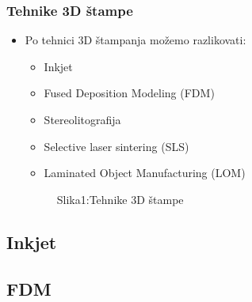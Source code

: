 \documentclass{beamer}
\begin{document}
\begin{frame}[fragile]\frametitle{Tehnike 3D štampe}
	\begin{itemize}
    \item Po tehnici 3D štampanja možemo razlikovati:
    \begin{itemize}
        \item Inkjet
        \item  Fused Deposition Modeling (FDM)
        \item Stereolitografija
        \item Selective laser sintering (SLS)
        \item Laminated Object Manufacturing (LOM)
        
    \end{itemize}
\begin{figure}[!tbp]
  \centering
  \hfill
  \hfill
  \label{Slika 1}
    \caption{\scriptsize{Slika1:Tehnike 3D štampe}}
    \end{figure}
\end{itemize}
\end{frame}
\subsection{Inkjet}


\subsection{FDM}
\end{document}
